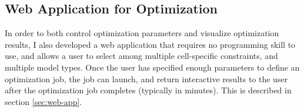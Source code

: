 


% 

\subsection{Web Application for Optimization}
In order to both control optimization parameters and visualize optimization results, I also developed a web application that requires no programming skill to use, and allows a user to select among multiple cell-specific constraints, and multiple model types.
Once the user has specified enough parameters to define an optimization job, the job can launch, and return interactive results to the user after the optimization job completes (typically in minutes).
This is described in section \ref{sec:web-app}.